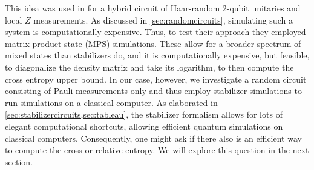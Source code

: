 This idea was used in \cite{garrattProbingPostmeasurementEntanglement2023} for
a hybrid circuit of Haar-random 2-qubit unitaries and local $Z$ measurements.
As discussed in \cref{sec:randomcircuits}, simulating such a system is
computationally expensive.
Thus, to test their approach they
employed matrix product state (MPS) simulations. These
allow for a broader spectrum of mixed states than stabilizers do, and it is
computationally expensive, but feasible, to diagonalize the density matrix and
take its logarithm, to then compute the cross entropy upper bound. In our case,
however, we investigate a random circuit consisting of Pauli measurements only
and thus employ stabilizer simulations to run simulations on a
classical computer. As elaborated in \cref{sec:stabilizercircuits,sec:tableau},
the stabilizer formalism allows for lots of elegant computational shortcuts,
allowing efficient quantum simulations on classical computers. Consequently,
one might ask if there also is an efficient way to compute the cross or
relative entropy. We will explore this question in the next section.



